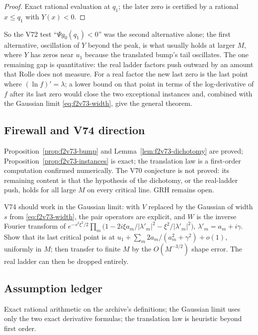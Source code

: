 \documentclass[11pt]{article}
\theoremstyle{definition}
\theoremstyle{remark}
\begin{document}
\begin{proof}
Exact rational evaluation at \(q_1\); the later zero is certified by a
rational \(x\le q_1\) with \(Y(x)<0\).
\end{proof}

So the V72 test ``\(\Psi g_0(q_1)<0\)'' was the second alternative alone;
the first alternative, oscillation of \(Y\) beyond the peak, is what
usually holds at larger \(M\), where \(Y\) has zeros near \(u_1\) because
the translated bump's tail oscillates.  The one remaining gap is
quantitative: the real ladder factors push outward by an amount that
Rolle does not measure.  For a real factor the new last zero is the last
point where \((\ln f)'=\lambda\); a lower bound on that point in terms of
the log-derivative of \(f\) after its last zero would close the two
exceptional instances and, combined with the Gaussian limit
\eqref{eq:f2v73-width}, give the general theorem.

\subsection*{Firewall and V74 direction}
\label{fire:f2v73}
Proposition~\ref{prop:f2v73-bump} and Lemma~\ref{lem:f2v73-dichotomy} are
proved; Proposition~\ref{prop:f2v73-instances} is exact; the translation
law is a first-order computation confirmed numerically.  The V70
conjecture is not proved: its remaining content is that the hypothesis of
the dichotomy, or the real-ladder push, holds for all large \(M\) on
every critical line.  GRH remains open.

V74 should work in the Gaussian limit: with \(V\) replaced by the Gaussian
of width \(s\) from \eqref{eq:f2v73-width}, the pair operators are
explicit, and \(W\) is the inverse Fourier transform of
\(e^{-s^2\xi^2/2}\prod_m\bigl(1-2i\xi a_m/|\lambda'_m|^2-\xi^2/|\lambda'_m|^2\bigr)\),
\(\lambda'_m=a_m+i\gamma\).  Show that its last critical point is at
\(u_1+\sum_m2a_m/(a_m^2+\gamma^2)+o(1)\), uniformly in \(M\); then
transfer to finite \(M\) by the \(O(M^{-3/2})\) shape error.  The real
ladder can then be dropped entirely.

\subsection*{Assumption ledger}
\label{ass:f2v73}
Exact rational arithmetic on the archive's definitions; the Gaussian
limit uses only the two exact derivative formulas; the translation law
is heuristic beyond first order.
\endgroup
\end{document}
